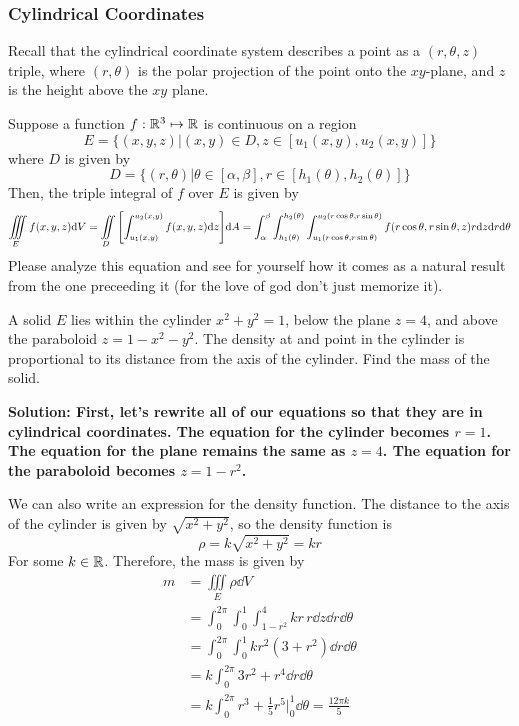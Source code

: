 \subsubsection{Cylindrical Coordinates}
Recall that the cylindrical coordinate system describes a point as a $(r, \theta, z)$ triple, where $(r, \theta)$ is the polar projection of the point onto the $xy$-plane, and $z$ is the height above the $xy$ plane. \par
Suppose a function $f: \mathbb{R}^3\mapsto \mathbb{R}$ is continuous on a region
\[ E = \{(x,y,z)|(x,y)\in D, z\in[u_1(x,y),u_2(x,y)] \}\]
where $D$ is given by
\[ D = \{(r,\theta)|\theta \in [\alpha, \beta], r\in[h_1(\theta),h_2(\theta)] \}\]
Then, the triple integral of $f$ over $E$ is given by
\[ \iiint\limits_E f(x,y,z)\dd V = \iint\limits_D \bqty{\int_{u_1(x,y)}^{u_2(x,y)}f(x,y,z)\dd z}\dd A = \int_\alpha^\beta\int_{h_1(\theta)}^{h_2(\theta)}\int_{u_1(r\cos\theta,r\sin\theta)}^{u_2(r\cos\theta,r\sin\theta)}f(r\cos\theta, r\sin\theta, z)r\dd z\dd r\dd \theta \]
Please analyze this equation and see for yourself how it comes as a natural result from the one preceeding it (for the love of god don't just memorize it). 
\begin{example}
    A solid $E$ lies within the cylinder $x^2+y^2=1$, below the plane $z=4$, and above the paraboloid $z=1-x^2-y^2$. The density at and point in the cylinder is proportional to its distance from the axis of the cylinder. Find the mass of the solid. \par
    \bf{Solution: }First, let's rewrite all of our equations so that they are in cylindrical coordinates. The equation for the cylinder becomes $r=1$. The equation for the plane remains the same as $z=4$. The equation for the paraboloid becomes $z = 1-r^2$. \par
    We can also write an expression for the density function. The distance to the axis of the cylinder is given by $\sqrt{x^2+y^2}$, so the density function is
    \[ \rho = k\sqrt{x^2+y^2} = kr \]
    For some $k\in\mathbb{R}$. Therefore, the mass is given by
    \begin{align*}
        m &= \iiint\limits_E \rho \dd V \\
        &= \int_0^{2\pi}\int_0^1\int_{1-r^2}^{4}kr \, r\dd z\dd r\dd \theta \\
        &= \int_0^{2\pi}\int_0^1 kr^2(3+r^2)\dd r\dd \theta \\
        &= k\int_0^{2\pi}3r^2+r^4\dd r\dd \theta \\
        &= k\int_0^{2\pi}r^3 +\frac{1}{5}r^5\biggr|_0^1\dd \theta = \boxed{\frac{12\pi k}{5}}
    \end{align*}
\end{example}
